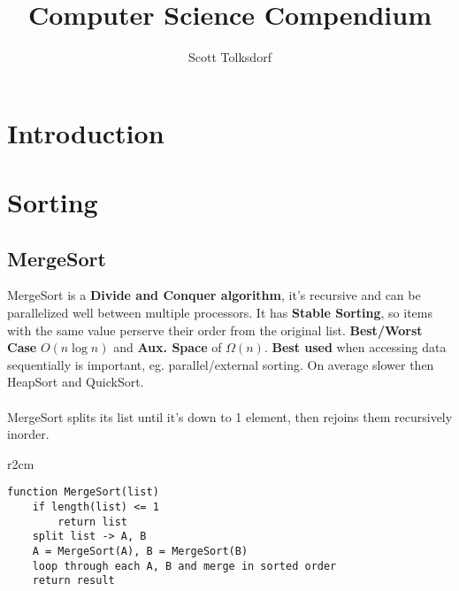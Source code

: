 \documentclass{article}
\begin{document}
\reversemarginpar

\title{Computer Science Compendium}
\author{Scott Tolksdorf}
\maketitle
\clearpage
\setcounter{tocdepth}{2}
\tableofcontents
\clearpage
\section{Introduction}

\clearpage
\section{Sorting}


\subsection{MergeSort}
MergeSort is a {\bf Divide and Conquer algorithm}, it's recursive and can be parallelized well between multiple processors. It has {\bf Stable Sorting}, so items with the same value perserve their order from the original list. {\bf Best/Worst Case} $O(n \log n)$ and {\bf Aux. Space} of  $\Omega(n)$. {\bf Best used} when accessing data sequentially is important, eg. parallel/external sorting. On average slower then HeapSort and QuickSort.
\\ \\
MergeSort splits its list until it's down to 1 element, then rejoins them recursively inorder.

\begin{wrapfigure}{r}{2cm}
\end{wrapfigure}
\begin{lstlisting}[style=pseudo]
function MergeSort(list)
	if length(list) <= 1
		return list
	split list -> A, B
	A = MergeSort(A), B = MergeSort(B)
	loop through each A, B and merge in sorted order
	return result
\end{lstlisting}
\end{document}
